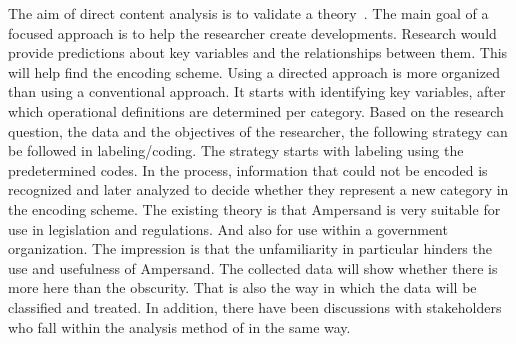 The aim of direct content analysis is to validate a theory~\citep{hsieh_three_2005}.
The main goal of a focused approach is to help the researcher create developments.
Research would provide predictions about key variables and the relationships between them.
This will help find the encoding scheme.
Using a directed approach is more organized than using a conventional approach.
It starts with identifying key variables, after which operational definitions are determined per category.
Based on the research question, the data and the objectives of the researcher, the following strategy can be followed in labeling/coding.
The strategy starts with labeling using the predetermined codes.
In the process, information that could not be encoded is recognized and later analyzed to decide whether they represent a new category in the encoding scheme.
The existing theory is that Ampersand is very suitable for use in legislation and regulations.
And also for use within a government organization.
The impression is that the unfamiliarity in particular hinders the use and usefulness of Ampersand.
The collected data will show whether there is more here than the obscurity.
That is also the way in which the data will be classified and treated.
In addition, there have been discussions with stakeholders who fall within the analysis method of \cite{hsieh_three_2005} in the same way.
